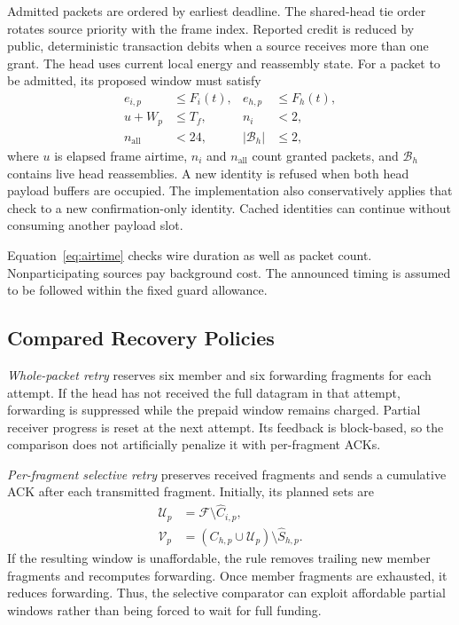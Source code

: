 \documentclass[journal,10pt]{IEEEtran}
\begin{document}
Admitted packets are ordered by earliest deadline. The shared-head tie order rotates source priority with the frame index. Reported credit is reduced by public, deterministic transaction debits when a source receives more than one grant. The head uses current local energy and reassembly state. For a packet to be admitted, its proposed window must satisfy
\begin{align}
e_{i,p}&\leq F_i(t),&e_{h,p}&\leq F_h(t),\label{eq:funding}\\
u+W_p&\leq T_f,&n_i&<2,\label{eq:airtime}\\
n_{\mathrm{all}}&<24,&|\mathcal B_h|&\leq2,\label{eq:caps}
\end{align}
where $u$ is elapsed frame airtime, $n_i$ and $n_{\mathrm{all}}$ count granted packets, and $\mathcal B_h$ contains live head reassemblies. A new identity is refused when both head payload buffers are occupied. The implementation also conservatively applies that check to a new confirmation-only identity. Cached identities can continue without consuming another payload slot.

Equation~\eqref{eq:airtime} checks wire duration as well as packet count. Nonparticipating sources pay background cost. The announced timing is assumed to be followed within the fixed guard allowance.

\subsection{Compared Recovery Policies}
\emph{Whole-packet retry} reserves six member and six forwarding fragments for each attempt. If the head has not received the full datagram in that attempt, forwarding is suppressed while the prepaid window remains charged. Partial receiver progress is reset at the next attempt. Its feedback is block-based, so the comparison does not artificially penalize it with per-fragment ACKs.

\emph{Per-fragment selective retry} preserves received fragments and sends a cumulative ACK after each transmitted fragment. Initially, its planned sets are
\begin{align}
\mathcal U_p&=\mathcal F\setminus\widehat C_{i,p},\\
\mathcal V_p&=(C_{h,p}\cup\mathcal U_p)\setminus\widehat S_{h,p}.
\label{eq:sets}
\end{align}
If the resulting window is unaffordable, the rule removes trailing new member fragments and recomputes forwarding. Once member fragments are exhausted, it reduces forwarding. Thus, the selective comparator can exploit affordable partial windows rather than being forced to wait for full funding.
\end{document}
